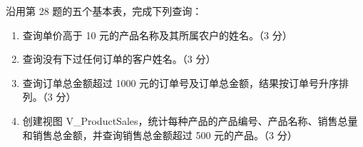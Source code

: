 \documentclass[a4paper,11pt]{article}
\begin{document}
\q 沿用第 28 题的五个基本表，完成下列查询：
\begin{enumerate}[label=（\arabic*）, leftmargin=2.4em, itemsep=1pt]
  \item 查询单价高于 10 元的产品名称及其所属农户的姓名。（3 分）
  \item 查询没有下过任何订单的客户姓名。（3 分）
  \item 查询订单总金额超过 1000 元的订单号及订单总金额，结果按订单号升序排列。（3 分）
  \item 创建视图 V\_ProductSales，统计每种产品的产品编号、产品名称、销售总量和销售总金额，并查询销售总金额超过 500 元的产品。（3 分）
\end{enumerate}
\anslines{4.5cm}
\end{document}
